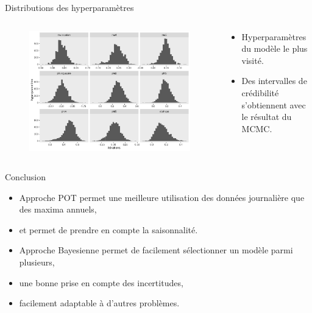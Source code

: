\documentclass[aspectratio=169]{beamer}
\begin{document}
\begin{frame}{Distributions des hyperparamètres}
\begin{columns}
	\begin{column}{0.65\textwidth}
		\begin{figure}
		\vspace{-0.4cm}
	 		\includegraphics[height=0.88\textheight, center]{../figures/hists.pdf}
		\end{figure}
	\end{column}
	\begin{column}{0.35\textwidth}
	\begin{itemize}
	\setlength{\itemsep}{17pt}
	\item Hyperparamètres du modèle le plus visité.
	\item Des intervalles de crédibilité s'obtiennent avec le résultat du MCMC.
	\end{itemize}
	\end{column}
\end{columns}
\end{frame}


\begin{frame}{Conclusion}
\begin{itemize}
	\setlength{\itemsep}{17pt}
	\item Approche POT permet une meilleure utilisation des données journalière que des maxima annuels,
	\item et permet de prendre en compte la saisonnalité.
	\item Approche Bayesienne permet de facilement sélectionner un modèle parmi plusieurs,
	\item une bonne prise en compte des incertitudes,
	\item facilement adaptable à d'autres problèmes.
\end{itemize}
\end{frame}
\end{document}
